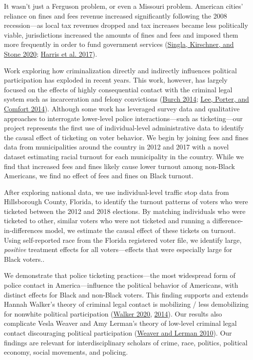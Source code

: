 \documentclass[
  12pt,
]{article}
\begin{document}
It wasn't just a Ferguson problem, or even a Missouri problem. American cities' reliance on fines and fees revenue increased significantly following the 2008 recession---as local tax revenues dropped and tax increases became less politically viable, jurisdictions increased the amounts of fines and fees and imposed them more frequently in order to fund government services (\protect\hyperlink{ref-Singla2020}{Singla, Kirschner, and Stone 2020}; \protect\hyperlink{ref-Harris2017}{Harris et al. 2017}).

Work exploring how criminalization directly and indirectly influences political participation has exploded in recent years. This work, however, has largely focused on the effects of highly consequential contact with the criminal legal system such as incarceration and felony convictions (\protect\hyperlink{ref-Burch2014}{Burch 2014}; \protect\hyperlink{ref-Lee2014}{Lee, Porter, and Comfort 2014}). Although some work has leveraged survey data and qualitative approaches to interrogate lower-level police interactions---such as ticketing---our project represents the first use of individual-level administrative data to identify the causal effect of ticketing on voter behavior. We begin by joining fees and fines data from municipalities around the country in 2012 and 2017 with a novel dataset estimating racial turnout for each municipality in the country. While we find that increased fees and fines likely cause lower turnout among non-Black Americans, we find no effect of fees and fines on Black turnout.

After exploring national data, we use individual-level traffic stop data from Hillsborough County, Florida, to identify the turnout patterns of voters who were ticketed between the 2012 and 2018 elections. By matching individuals who were ticketed to other, similar voters who were not ticketed and running a difference-in-differences model, we estimate the causal effect of these tickets on turnout. Using self-reported race from the Florida registered voter file, we identify large, \emph{positive} treatment effects for all voters---effects that were especially large for Black voters..

We demonstrate that police ticketing practices---the most widespread form of police contact in America---influence the political behavior of Americans, with distinct effects for Black and non-Black voters. This finding supports and extends Hannah Walker's theory of criminal legal contact is mobilizing / less demobilizing for nonwhite political participation (\protect\hyperlink{ref-Walker2020}{Walker 2020}, \protect\hyperlink{ref-Walker2014}{2014}). Our results also complicate Vesla Weaver and Amy Lerman's theory of low-level criminal legal contact discouraging political participation (\protect\hyperlink{ref-Weaver2010}{Weaver and Lerman 2010}). Our findings are relevant for interdisciplinary scholars of crime, race, politics, political economy, social movements, and policing.
\end{document}

